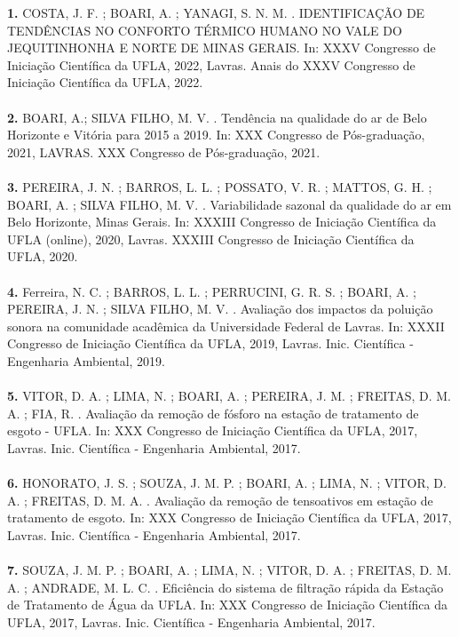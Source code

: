 \documentclass[12pt,a4paper,sans]{moderncv}        %
\begin{document}
	
	\textbf{1.} COSTA, J. F. ; BOARI, A. ; YANAGI, S. N. M. . IDENTIFICAÇÃO DE TENDÊNCIAS NO CONFORTO TÉRMICO HUMANO NO VALE DO JEQUITINHONHA E NORTE DE MINAS GERAIS. In: XXXV Congresso de Iniciação Científica da UFLA, 2022, Lavras. Anais do XXXV Congresso de Iniciação Científica da UFLA, 2022.
	\\\\
	\textbf{2.} BOARI, A.; SILVA FILHO, M. V. . Tendência na qualidade do ar de Belo Horizonte e Vitória para 2015 a 2019. In: XXX Congresso de Pós-graduação, 2021, LAVRAS. XXX Congresso de Pós-graduação, 2021.
	\\\\
	\textbf{3.} PEREIRA, J. N. ; BARROS, L. L. ; POSSATO, V. R. ; MATTOS, G. H. ; BOARI, A. ; SILVA FILHO, M. V. . Variabilidade sazonal da qualidade do ar em Belo Horizonte, Minas Gerais. In: XXXIII Congresso de Iniciação Científica da UFLA (online), 2020, Lavras. XXXIII Congresso de Iniciação Científica da UFLA, 2020.
	\\\\
	\textbf{4.} Ferreira, N. C. ; BARROS, L. L. ; PERRUCINI, G. R. S. ; BOARI, A. ; PEREIRA, J. N. ; SILVA FILHO, M. V. . Avaliação dos impactos da poluição sonora na comunidade acadêmica da Universidade Federal de Lavras. In: XXXII Congresso de Iniciação Científica da UFLA, 2019, Lavras. Inic. Científica - Engenharia Ambiental, 2019.
	\\\\
	\textbf{5.} VITOR, D. A. ; LIMA, N. ; BOARI, A. ; PEREIRA, J. M. ; FREITAS, D. M. A. ; FIA, R. . Avaliação da remoção de fósforo na estação de tratamento de esgoto - UFLA. In: XXX Congresso de Iniciação Científica da UFLA, 2017, Lavras. Inic. Científica - Engenharia Ambiental, 2017.
	\\\\
	\textbf{6.} HONORATO, J. S. ; SOUZA, J. M. P. ; BOARI, A. ; LIMA, N. ; VITOR, D. A. ; FREITAS, D. M. A. . Avaliação da remoção de tensoativos em estação de tratamento de esgoto. In: XXX Congresso de Iniciação Científica da UFLA, 2017, Lavras. Inic. Científica - Engenharia Ambiental, 2017.
	\\\\
	\textbf{7.} SOUZA, J. M. P. ; BOARI, A. ; LIMA, N. ; VITOR, D. A. ; FREITAS, D. M. A. ; ANDRADE, M. L. C. . Eficiência do sistema de filtração rápida da Estação de Tratamento de Água da UFLA. In: XXX Congresso de Iniciação Científica da UFLA, 2017, Lavras. Inic. Científica - Engenharia Ambiental, 2017.
	\\\\
\end{document}
